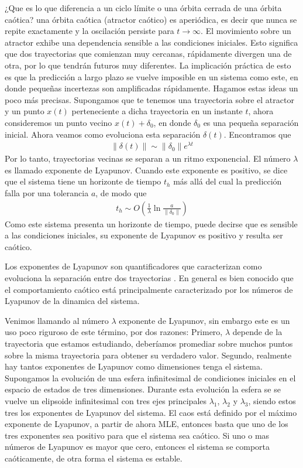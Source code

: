 ¿Que es lo que diferencia a un ciclo límite o una órbita cerrada de una órbita caótica? una órbita caótica (atractor caótico) es aperiódica, es decir que nunca se repite exactamente y la oscilación persiste para $t \to \infty$.
El movimiento sobre un atractor exhibe una dependencia sensible a las condiciones iniciales.
Esto significa que dos trayectorias que comienzan muy cercanas, rápidamente divergen una de otra, por lo que tendrán futuros muy diferentes.
La implicación práctica de esto es que la predicción a largo plazo se vuelve imposible en un sistema como este, en donde pequeñas incertezas son amplificadas rápidamente.
Hagamos estas ideas un poco más precisas.
Supongamos que te tenemos una trayectoria sobre el atractor y un punto $x(t)$ perteneciente a dicha trayectoria en un instante $t$, ahora consideremos un punto vecino $x(t) + \delta_0$, en donde $\delta_0$ es una pequeña separación inicial.
Ahora veamos como evoluciona esta separación $\delta(t)$.
Encontramos que
%
\begin{eqnarray}
\lVert \delta(t) \rVert \sim \lVert \delta_0 \rVert e^{\lambda t}
\end{eqnarray}
%
Por lo tanto, trayectorias vecinas se separan a un ritmo exponencial.
El número $\lambda$ es llamado exponente de Lyapunov.
Cuando este exponente es positivo, se dice que el sistema tiene un horizonte de tiempo $t_h$ más allá del cual la predicción falla por una tolerancia $a$, de modo que
%
\begin{eqnarray}
t_h \sim O ( \frac{1}{\lambda} \ln \frac{a}{\lVert \delta_0 \rVert})
\end{eqnarray}
%
Como este sistema presenta un horizonte de tiempo, puede decirse que es sensible a las condiciones iniciales, su exponente de Lyapunov es positivo y resulta ser caótico.

Los exponentes de Lyapunov son quantificadores que caracterizan como evoluciona la separación entre dos trayectorias \cite{Sprott2003}.
En general es bien conocido que el comportamiento caótico está principalmente caracterizado por los números de Lyapunov de la dinamica del sistema.

Venimos llamando al número $\lambda$ exponente de Lyapunov, sin embargo este es un uso poco riguroso de este término, por dos razones:
Primero, $\lambda$ depende de la trayectoria que estamos estudiando, deberíamos promediar sobre muchos puntos sobre la misma trayectoria para obtener su verdadero valor.
Segundo, realmente hay tantos exponentes de Lyapunov como dimensiones tenga el sistema.
Supongamos la evolución de una esfera infinitesimal de condiciones iniciales en el espacio de estados de tres dimensiones.
Durante esta evolución la esfera se se vuelve un elipsoide infinitesimal con tres ejes principales $\lambda_1$, $\lambda_2$ y $\lambda_3$, siendo estos tres los exponentes de Lyapunov del sistema.
El caos está definido por el máximo exponente de Lyapunov, a partir de ahora MLE, entonces basta que uno de los tres exponentes sea positivo para que el sistema sea caótico.
Si uno o mas números de Lyapunov es mayor que cero, entonces el sistema se comporta caóticamente, de otra forma el sistema es estable.

